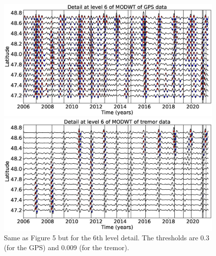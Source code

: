 \documentclass{article}
\begin{document}
\begin{figure}
\noindent\includegraphics[width=\textwidth, trim={0cm 0cm 0cm 0cm},clip]{figures/GPS_longer_detail_6.eps}

\noindent\includegraphics[width=\textwidth, trim={0cm 0cm 0cm 0cm},clip]{figures/tremor_longer_detail_6.eps}
\caption{Same as Figure 5 but for the 6th level detail. The thresholds are 0.3 (for the GPS) and 0.009 (for the tremor).}
\label{pngfiguresample}
\end{figure}
\end{document}
